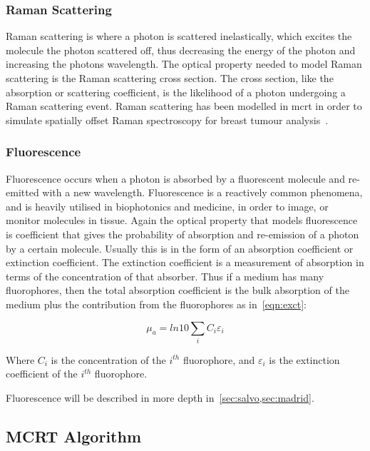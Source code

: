 \subsubsection*{Raman Scattering}
Raman scattering is where a photon is scattered inelastically, which excites the molecule the photon scattered off, thus decreasing the energy of the photon and increasing the photons wavelength. 
The optical property needed to model Raman scattering is the Raman scattering cross section. The cross section, like the absorption or scattering coefficient, is the likelihood of a photon undergoing a Raman scattering event. Raman scattering has been modelled in \gls*{mcrt} in order to simulate spatially offset Raman spectroscopy for breast tumour analysis~\cite{keller2010monte}.

\medskip

\subsubsection*{Fluorescence}



Fluorescence occurs when a photon is absorbed by a fluorescent molecule and re-emitted with a new wavelength. Fluorescence	is a reactively common phenomena, and is heavily utilised in biophotonics and medicine, in order to image, or monitor molecules in tissue. Again the optical property that models fluorescence is coefficient that gives the probability of absorption and re-emission of a photon by a certain molecule. Usually this is in the form of an absorption coefficient or extinction coefficient. The extinction coefficient is a measurement of absorption in terms of the concentration of that absorber. Thus if a medium has many fluorophores, then the total absorption coefficient is the bulk absorption of the medium plus the contribution from the fluorophores as in~\cref{eqn:exct}:

\begin{equation}
\mu_a=ln10 \sum_i C_i \varepsilon_i
\label{eqn:exct}	
\end{equation}

Where $C_i$ is the concentration of the $i^{th}$ fluorophore, and $\varepsilon_i$ is the extinction coefficient of the $i^{th}$ fluorophore.

Fluorescence will be described in more depth in~\cref{sec:salvo,sec:madrid}.

\subsection{MCRT Algorithm}\label{sec:algorithmMCRT}

